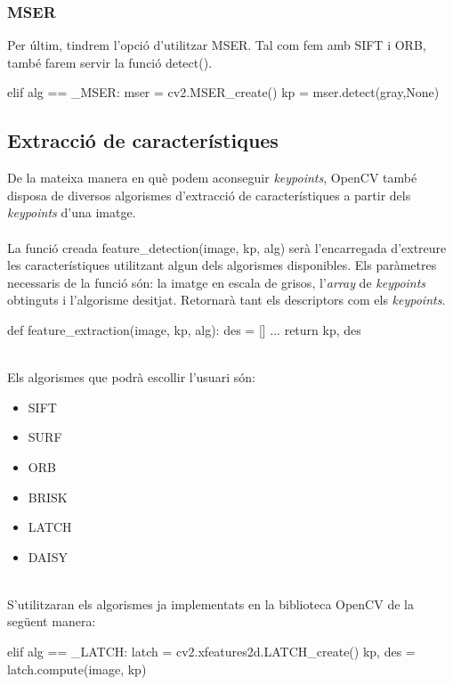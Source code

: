 		\subsubsection{MSER}
		Per últim, tindrem l'opció d'utilitzar MSER. Tal com fem amb SIFT i ORB, també farem servir la funció detect().\\
		\begin{python}
	elif alg == _MSER:
		mser = cv2.MSER_create()
		kp = mser.detect(gray,None)
		\end{python}
\newpage
	\subsection{Extracció de característiques}
		De la mateixa manera en què podem aconseguir \textit{keypoints}, OpenCV també disposa de diversos algorismes d'extracció de característiques a partir dels \textit{keypoints} d'una imatge.\\\\
		La funció creada feature{\_}detection(image, kp, alg) serà l'encarregada d'extreure les característiques utilitzant algun dels algorismes disponibles. Els paràmetres necessaris de la funció són:
		la imatge en escala de grisos, l'\textit{array} de \textit{keypoints} obtinguts i l'algorisme desitjat. Retornarà tant els descriptors com els \textit{keypoints}.\\

		\begin{python}
def feature_extraction(image, kp, alg):
	des = []
	...
	return kp, des
		\end{python}
		\ \\Els algorismes que podrà escollir l'usuari són:
		\begin{multicols}{3} 
			\begin{itemize}
				\item{SIFT}
				\item{SURF}
				\item{ORB}
				\item{BRISK}
				\item{LATCH}
				\item{DAISY}
			\end{itemize}
		\end{multicols}
	\ \\S'utilitzaran els algorismes ja implementats en la biblioteca OpenCV de la següent manera:\\

		\begin{python}
	elif alg == _LATCH:
		latch = cv2.xfeatures2d.LATCH_create()
		kp, des = latch.compute(image, kp)
		\end{python}

